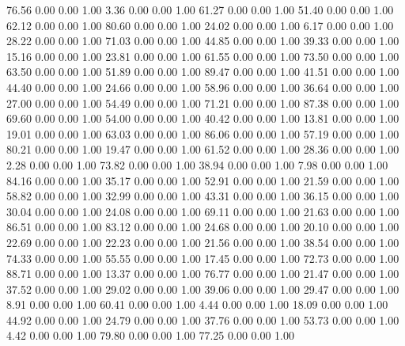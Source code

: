    76.56   0.00   0.00   1.00
    3.36   0.00   0.00   1.00
   61.27   0.00   0.00   1.00
   51.40   0.00   0.00   1.00
   62.12   0.00   0.00   1.00
   80.60   0.00   0.00   1.00
   24.02   0.00   0.00   1.00
    6.17   0.00   0.00   1.00
   28.22   0.00   0.00   1.00
   71.03   0.00   0.00   1.00
   44.85   0.00   0.00   1.00
   39.33   0.00   0.00   1.00
   15.16   0.00   0.00   1.00
   23.81   0.00   0.00   1.00
   61.55   0.00   0.00   1.00
   73.50   0.00   0.00   1.00
   63.50   0.00   0.00   1.00
   51.89   0.00   0.00   1.00
   89.47   0.00   0.00   1.00
   41.51   0.00   0.00   1.00
   44.40   0.00   0.00   1.00
   24.66   0.00   0.00   1.00
   58.96   0.00   0.00   1.00
   36.64   0.00   0.00   1.00
   27.00   0.00   0.00   1.00
   54.49   0.00   0.00   1.00
   71.21   0.00   0.00   1.00
   87.38   0.00   0.00   1.00
   69.60   0.00   0.00   1.00
   54.00   0.00   0.00   1.00
   40.42   0.00   0.00   1.00
   13.81   0.00   0.00   1.00
   19.01   0.00   0.00   1.00
   63.03   0.00   0.00   1.00
   86.06   0.00   0.00   1.00
   57.19   0.00   0.00   1.00
   80.21   0.00   0.00   1.00
   19.47   0.00   0.00   1.00
   61.52   0.00   0.00   1.00
   28.36   0.00   0.00   1.00
    2.28   0.00   0.00   1.00
   73.82   0.00   0.00   1.00
   38.94   0.00   0.00   1.00
    7.98   0.00   0.00   1.00
   84.16   0.00   0.00   1.00
   35.17   0.00   0.00   1.00
   52.91   0.00   0.00   1.00
   21.59   0.00   0.00   1.00
   58.82   0.00   0.00   1.00
   32.99   0.00   0.00   1.00
   43.31   0.00   0.00   1.00
   36.15   0.00   0.00   1.00
   30.04   0.00   0.00   1.00
   24.08   0.00   0.00   1.00
   69.11   0.00   0.00   1.00
   21.63   0.00   0.00   1.00
   86.51   0.00   0.00   1.00
   83.12   0.00   0.00   1.00
   24.68   0.00   0.00   1.00
   20.10   0.00   0.00   1.00
   22.69   0.00   0.00   1.00
   22.23   0.00   0.00   1.00
   21.56   0.00   0.00   1.00
   38.54   0.00   0.00   1.00
   74.33   0.00   0.00   1.00
   55.55   0.00   0.00   1.00
   17.45   0.00   0.00   1.00
   72.73   0.00   0.00   1.00
   88.71   0.00   0.00   1.00
   13.37   0.00   0.00   1.00
   76.77   0.00   0.00   1.00
   21.47   0.00   0.00   1.00
   37.52   0.00   0.00   1.00
   29.02   0.00   0.00   1.00
   39.06   0.00   0.00   1.00
   29.47   0.00   0.00   1.00
    8.91   0.00   0.00   1.00
   60.41   0.00   0.00   1.00
    4.44   0.00   0.00   1.00
   18.09   0.00   0.00   1.00
   44.92   0.00   0.00   1.00
   24.79   0.00   0.00   1.00
   37.76   0.00   0.00   1.00
   53.73   0.00   0.00   1.00
    4.42   0.00   0.00   1.00
   79.80   0.00   0.00   1.00
   77.25   0.00   0.00   1.00
